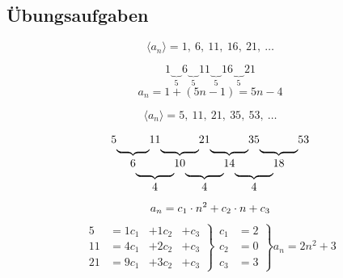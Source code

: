 \subsection{Übungsaufgaben}

\begin{uebung}[1]
	\begin{aufgabe}
		\[
			\langle a_n \rangle = 1,\ 6,\ 11,\ 16,\ 21,\ \ldots
		\]
	\end{aufgabe}

	\begin{loesung}
		\[
			1\underbrace{\quad}_{5}6\underbrace{\quad}_{5}11\underbrace{\quad}_{5}16\underbrace{\quad}_{5}21
		\]
		\[
			a_n = 1+(5n - 1) = 5n - 4
		\]
	\end{loesung}
\end{uebung}

\begin{uebung}[2]
	\begin{aufgabe}
		\[
			\langle a_n \rangle = 5,\ 11,\ 21,\ 35,\ 53,\ \ldots
		\]
	\end{aufgabe}

	\begin{loesung}
		\[
			\begin{tabular}{ccccccccccccc}
				5 &      & 11   &      & 21   &      & 35   &      & 53 \\[-3pt]
				  & \ubf &      & \ubf &      & \ubf &      & \ubf      \\
				  & 6    &      & 10   &      & 14   &      & 18        \\[-3pt]
				  &      & \ubf &      & \ubf &      & \ubf             \\
				  &      & 4    &      & 4    &      & 4
			\end{tabular}
		\]
		\[
			a_n = c_1 \cdot n^2 + c_2 \cdot n + c_3 \\
		\]
		\begin{align*}
			\left.
			\begin{array}{ccccc}
				5  & = 1 c_1 & + 1 c_2 & + c_3 \\
				11 & = 4 c_1 & + 2 c_2 & + c_3 \\
				21 & = 9 c_1 & + 3 c_2 & + c_3
			\end{array}
			\right \}
			\left.
			\begin{array}{cc}
				c_1 & = 2 \\
				c_2 & = 0 \\
				c_3 & = 3
			\end{array}
			\right \}
			a_n = 2n^2 + 3
		\end{align*}
	\end{loesung}
\end{uebung}


